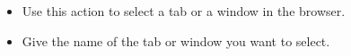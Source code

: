 
\begin{itemize} 
\item Use this action to select a tab or a window in the browser. 
\item Give the name of the tab or window you want to select. 
\end{itemize}
